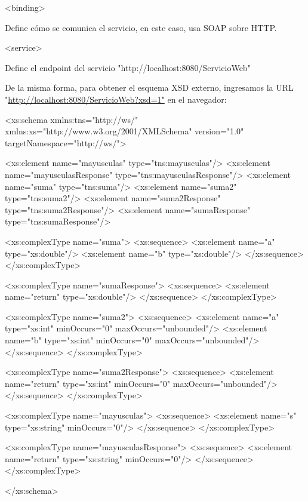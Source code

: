 \begin{SourceCode}
<binding>

Define cómo se comunica el servicio, en este caso, usa SOAP sobre HTTP.
\end{SourceCode}

\begin{SourceCode}
<service>

Define el endpoint del servicio "http://localhost:8080/ServicioWeb"
\end{SourceCode}

De la misma forma, para obtener el esquema XSD externo, ingresamos la URL "\url{http://localhost:8080/ServicioWeb?xsd=1"} en el navegador:

\begin{SourceCode}
<xs:schema xmlns:tns="http://ws/"
   xmlns:xs="http://www.w3.org/2001/XMLSchema"
   version="1.0"
   targetNamespace="http://ws/">

<xs:element name="mayusculas" type="tns:mayusculas"/>
<xs:element name="mayusculasResponse" type="tns:mayusculasResponse"/>
<xs:element name="suma" type="tns:suma"/>
<xs:element name="suma2" type="tns:suma2"/>
<xs:element name="suma2Response" type="tns:suma2Response"/>
<xs:element name="sumaResponse" type="tns:sumaResponse"/>

<xs:complexType name="suma">
<xs:sequence>
    <xs:element name="a" type="xs:double"/>
    <xs:element name="b" type="xs:double"/>
</xs:sequence>
</xs:complexType>

<xs:complexType name="sumaResponse">
<xs:sequence>
    <xs:element name="return" type="xs:double"/>
</xs:sequence>
</xs:complexType>

<xs:complexType name="suma2">
<xs:sequence>
    <xs:element name="a"
                type="xs:int"
                minOccurs="0"
                maxOccurs="unbounded"/>
    <xs:element name="b"
                type="xs:int"
                minOccurs="0"
                maxOccurs="unbounded"/>
</xs:sequence>
</xs:complexType>

<xs:complexType name="suma2Response">
<xs:sequence>
    <xs:element name="return"
                type="xs:int"
                minOccurs="0"
                maxOccurs="unbounded"/>
</xs:sequence>
</xs:complexType>

<xs:complexType name="mayusculas">
<xs:sequence>
    <xs:element name="s"
                type="xs:string"
                minOccurs="0"/>
</xs:sequence>
</xs:complexType>

<xs:complexType name="mayusculasResponse">
<xs:sequence>
    <xs:element name="return"
                type="xs:string"
                minOccurs="0"/>
</xs:sequence>
</xs:complexType>

</xs:schema>
\end{SourceCode}

